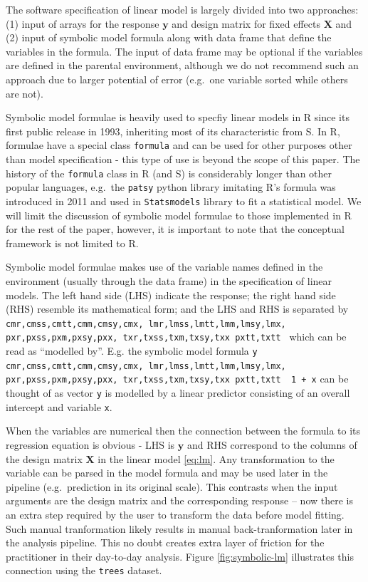 \documentclass[runningheads]{llncs}
\makeatletter
\newcommand\midtilde@raisedtilde[1][.5]{\raisebox{#1ex}{\texttildelow}}
\def\midtilde@normaltilde{\texttildelow}
\newcommand\midtilde%
{%
  \expandafter\in@\expandafter{\f@family}%
    {cmr,cmss,cmtt,cmm,cmsy,cmx,%
    lmr,lmss,lmtt,lmm,lmsy,lmx,%
    pxr,pxss,pxm,pxsy,pxx,%
    txr,txss,txm,txsy,txx}%
  \ifin@%
    \midtilde@raisedtilde%
  \else%
    \expandafter\in@\expandafter{\f@family}%
    {pxtt,txtt}%
    \ifin@%
      \midtilde@raisedtilde[.35]%
    \else%
      \midtilde@normaltilde%
    \fi%
  \fi%
}
\makeatother
\begin{document}
The software specification of linear model is largely divided into two approaches: (1) input of arrays for the response \(\boldsymbol{y}\) and design matrix for fixed effects \(\mathbf{X}\) and (2) input of symbolic model formula along with data frame that define the variables in the formula. The input of data frame may be optional if the variables are defined in the parental environment, although we do not recommend such an approach due to larger potential of error (e.g.~one variable sorted while others are not).

Symbolic model formulae is heavily used to specfiy linear models in R since its first public release in 1993, inheriting most of its characteristic from S. In R, formulae have a special class \texttt{formula} and can be used for other purposes other than model specification - this type of use is beyond the scope of this paper. The history of the \texttt{formula} class in R (and S) is considerably longer than other popular languages, e.g.~the \texttt{patsy} python library \autocite{patsy} imitating R's formula was introduced in 2011 and used in \texttt{Statsmodels} library \autocite{seabold2010statsmodels} to fit a statistical model. We will limit the discussion of symbolic model formulae to those implemented in R for the rest of the paper, however, it is important to note that the conceptual framework is not limited to R.

Symbolic model formulae makes use of the variable names defined in the environment (usually through the data frame) in the specification of linear models. The left hand side (LHS) indicate the response; the right hand side (RHS) resemble its mathematical form; and the LHS and RHS is separated by \texttt{\midtilde} which can be read as ``modelled by''. E.g. the symbolic model formula \texttt{y \midtilde\ 1 + x} can be thought of as vector \texttt{y} is modelled by a linear predictor consisting of an overall intercept and variable \texttt{x}.

When the variables are numerical then the connection between the formula to its regression equation is obvious - LHS is \(\boldsymbol{y}\) and RHS correspond to the columns of the design matrix \(\mathbf{X}\) in the linear model \eqref{eq:lm}. Any transformation to the variable can be parsed in the model formula and may be used later in the pipeline (e.g.~prediction in its original scale). This contrasts when the input arguments are the design matrix and the corresponding response -- now there is an extra step required by the user to transform the data before model fitting. Such manual tranformation likely results in manual back-tranformation later in the analysis pipeline. This no doubt creates extra layer of friction for the practitioner in their day-to-day analysis. Figure \ref{fig:symbolic-lm} illustrates this connection using the \texttt{trees} dataset.
\end{document}
